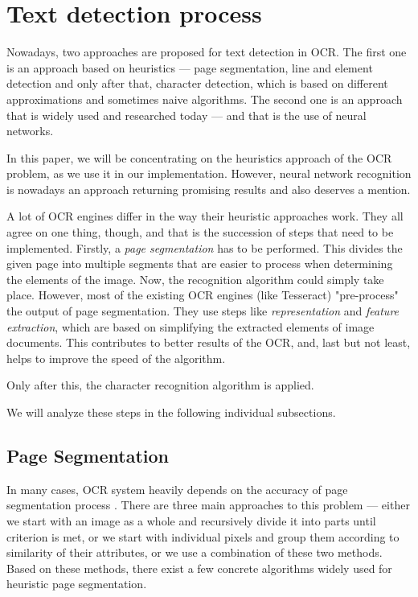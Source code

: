 
\section{Text detection process}

Nowadays, two approaches are proposed for text detection in OCR. The first one is an approach based on heuristics --- page segmentation, line and element detection and only after that, character detection, which is based on different approximations and sometimes naive algorithms. The second one is an approach that is widely used and researched today --- and that is the use of neural networks.

In this paper, we will be concentrating on the heuristics approach of the OCR problem, as we use it in our implementation. However, neural network recognition is nowadays an approach returning  promising results and also deserves a mention.

A lot of OCR engines differ in the way their heuristic approaches work. They all agree on one thing, though, and that is the succession of steps that need to be implemented. Firstly, a \emph{page segmentation} has to be performed. This divides the given page into multiple segments that are easier to process when determining the elements of the image. Now, the recognition algorithm could simply take place. However, most of the existing OCR engines (like Tesseract) "pre-process" the output of page segmentation. They use steps like \emph{representation} and \emph{feature extraction}, which are based on simplifying the extracted elements of image documents. This contributes to better results of the OCR, and, last but not least, helps to improve the speed of the algorithm.

Only after this, the character recognition algorithm is applied.

We will analyze these steps in the following individual subsections.

\subsection{Page Segmentation}

In many cases, OCR system heavily depends on the accuracy of page segmentation process \citep{pageSegmentation}. There are three main approaches \citep{segmentationBenchmark} to this problem --- either we start with an image as a whole and recursively divide it into parts until criterion is met, or we start with individual pixels and group them according to similarity of their attributes, or we use a combination of these two methods. Based on these methods, there exist a few concrete algorithms widely used for heuristic page segmentation.

